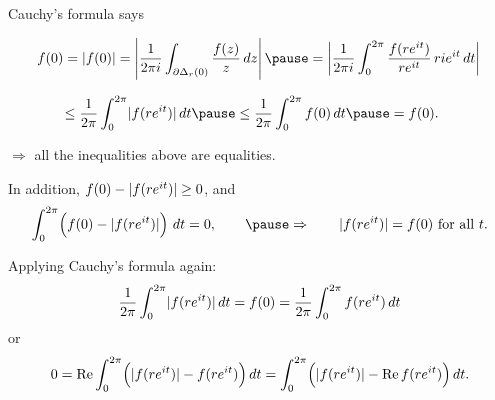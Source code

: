 \documentclass[10pt,aspectratio=169]{beamer}
\begin{document}
\begin{frame}
Cauchy's formula says

\medskip
$\displaystyle
\qquad
f(0) = \sabs{f(0)} =
\abs{\frac{1}{2\pi i}
\int_{\partial \Delta_r(0)}
\frac{f(z)}{z} \, dz
}
\pause
 =
\abs{
\frac{1}{2\pi i}
\int_0^{2\pi}
\frac{f(re^{it})}{re^{it}} \, ri e^{it} \, dt
}
$

\pause
$\displaystyle
\qquad\qquad \leq
\frac{1}{2\pi}
\int_0^{2\pi}
\sabs{f(re^{it})}\, dt
\pause
\leq
\frac{1}{2\pi}
\int_0^{2\pi}
f(0)\, dt \pause = f(0) .
$

\pause
\medskip

$\Rightarrow$ all the inequalities above are equalities.

\medskip
\pause

In addition, $f(0)-\lvert {f(re^{it})} \rvert \geq 0$, and
\[
\int_0^{2\pi}\Bigl( f(0)-\sabs{f(re^{it})} \Bigr) \ dt = 0 ,
\qquad \pause \Rightarrow \qquad \sabs{f(re^{it})} = f(0) \text{ for all } t.
\]

\medskip
\pause

Applying Cauchy's formula
again:
\begin{equation*}
\frac{1}{2\pi}
\int_0^{2\pi}
\lvert {f(re^{it})} \rvert\, dt
=
f(0)
=
\frac{1}{2\pi}
\int_0^{2\pi}
f(re^{it})\, dt
\end{equation*}
\pause
or
\begin{equation*}
0 =
\operatorname{Re} \int_0^{2\pi}
\Bigl(\lvert {f(re^{it})} \rvert-f(re^{it})\Bigr)\, dt
=
\int_0^{2\pi}
\Bigl(\lvert {f(re^{it})} \rvert-\operatorname{Re} f(re^{it})\Bigr)\, dt .
\end{equation*}

\end{frame}
\end{document}
